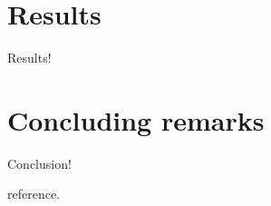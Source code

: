 \documentclass[11pt]{article}
\begin{document}

\section{Results}
Results!




\section{Concluding remarks}
Conclusion!




\newpage


\begin{description}

\item reference.



\end{description}
\end{document}
